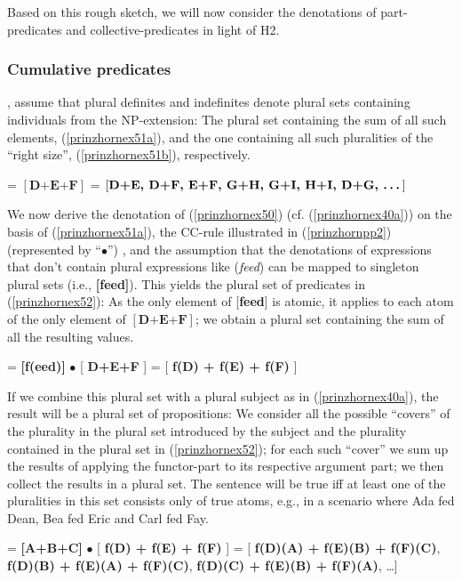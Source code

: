 \documentclass[output=paper,colorlinks,citecolor=brown,
]{langscibook}
\begin{document}
Based on this rough sketch, we will now consider the denotations of part-predicates and collective-predicates in light of H2.

\subsubsection{Cumulative predicates}\label{prinzhornsec:cum}  
\citet{Haslinger:2018a, Haslinger:2018b}, assume that plural definites and indefinites denote plural sets containing individuals from the NP-extension: The plural set containing the sum of all such elements, (\ref{prinzhornex51a}), and the one containing all such pluralities of the “right size”, (\ref{prinzhornex51b}), respectively.


\ea 
\ea {} = $[ \textbf{D+E+F} ]$\label{prinzhornex51a}
\ex {} = $[ \textbf{D+E, D+F, E+F, G+H, G+I, H+I, D+G,  \dots} ]$\label{prinzhornex51b}
\z\z

We now derive the denotation of (\ref{prinzhornex50}) (cf. (\ref{prinzhornex40a})) on the basis of (\ref{prinzhornex51a}), the CC-rule illustrated in (\ref{prinzhornpp2}) (represented by “$\bullet$”) , and the assumption that the denotations of expressions that don't contain plural expressions like (\textit{feed}) can be mapped to singleton plural sets (i.e., \textbf{[feed]}). This yields the plural set of predicates in (\ref{prinzhornex52}): As the only element of [\textbf{feed}] is atomic, it applies to each atom of the only element of  $[ \textbf{D+E+F} ]$; we obtain a plural set containing the sum of all the resulting values. 

\ea {} = \textbf{[f(eed)]} $\bullet$ [ \textbf{D+E+F} ] =  [ \textbf{f(D) + f(E) + f(F)} ]\label{prinzhornex52}
\z

If we combine this plural set with a plural subject as in (\ref{prinzhornex40a}), the result will be a plural set of propositions: We consider all the possible “covers” of the plurality in the plural set introduced by the subject and the plurality contained in the plural set in (\ref{prinzhornex52}); for each such “cover” we sum up the results of applying the functor-part to its respective argument part; we then collect the results in a plural set. The sentence will be true iff at least one of the pluralities in this set consists only of true atoms, e.g., in a scenario where Ada fed Dean, Bea fed Eric and Carl fed Fay.

\ea {} = \textbf{[A+B+C]} $\bullet$  [ \textbf{f(D) + f(E) + f(F)} ] =  [ \textbf{f(D)(A) + f(E)(B) + f(F)(C)}, \textbf{f(D)(B) + f(E)(A) + f(F)(C)},  \textbf{f(D)(C) + f(E)(B) + f(F)(A)}, \dots ]
\label{prinzhornex53}
\z
\end{document}
